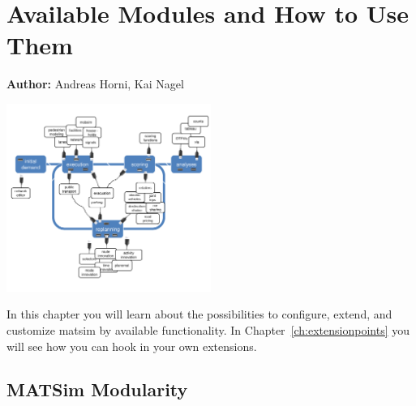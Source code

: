 \chapter{Available Modules and How to Use Them}
\label{ch:modules}

\hfill \textbf{Author:} Andreas Horni, Kai Nagel

\begin{center} \includegraphics[width=0.5\textwidth, angle=0]{extending/figures/modules.pdf} \end{center}

In this chapter you will learn about the possibilities to configure, extend, and customize \gls{matsim} by available functionality. In Chapter~\ref{ch:extensionpoints} you will see how you can hook in your own extensions.


\section{MATSim Modularity}
\label{sec:matsim-modularity}

